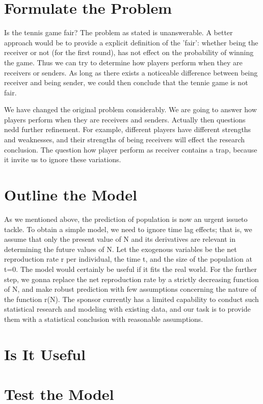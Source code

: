 \documentclass[12pt,letterpaper]{article}
\theoremstyle{definition}
\begin{document}
\section{Formulate the Problem} 
Is the tennis game fair? The problem as stated is unanswerable. A better approach would be to provide a explicit definition of the 'fair': whether being the receiver or not (for the first round), has not effect on the probability of winning the game. Thus we can try to determine how players perform when they are receivers or senders. As long as there exists a noticeable difference between being receiver and being sender, we could then conclude that the tennie game is not fair.

We have changed the original problem considerably. We are going to answer how players perform when they are receivers and senders. Actually then questions nedd further refinement. For example, different players have different strengths and weaknesses, and their strengths of being receivers will effect the research conclusion. The question how player perform as receiver contains a trap, because it invite us to ignore these variations.

\section{Outline the Model}
As we mentioned above, the prediction of population is now an urgent issueto tackle. To obtain a simple model, we need to ignore time lag effects; that is, we assume that only the present value of N and its derivatives are relevant in determining the future values of N. Let the exogenous variables be the net reproduction rate r per individual, the time t, and the size of the population at t=0. The model would certainly be useful if it fits the real world. For the further step, we gonna replace the net reproduction rate by a strictly decreasing function of N, and make robust prediction with few assumptions concerning the nature of the function r(N).  
The sponsor currently has a limited capability to conduct such statistical research and modeling with existing data, and our task is to provide them with a statistical conclusion with reasonable assumptions.
  
\section{Is It Useful}


\section{Test the Model}
\end{document}
